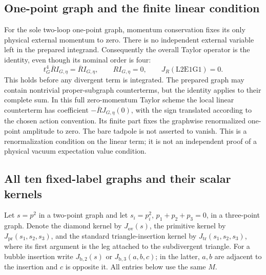 \subsection{One-point graph and the finite linear condition}

For the sole two-loop one-point graph, momentum conservation fixes its only
physical external momentum to zero. There is no independent external
variable left in the prepared integrand. Consequently the overall Taylor
operator is the identity, even though its nominal order is four:
\[
 t_G^4\overline R I_{G,\eta}=\overline R I_{G,\eta},\qquad
 RI_{G,\eta}=0,
 \qquad J_R(\mathrm{L2E1G1})=0.
\]
This holds before any divergent term is integrated. The prepared graph may
contain nontrivial proper-subgraph counterterms, but the identity applies
to their complete sum. In this full zero-momentum Taylor scheme the local
linear counterterm has coefficient
$-\overline R J_{G,\eta}(0)$, with the sign translated according to the
chosen action convention. Its finite part fixes the graphwise renormalized
one-point amplitude to zero. The bare tadpole is not asserted to vanish.
This is a renormalization condition on the linear term; it is not an
independent proof of a physical vacuum expectation value condition.

\subsection{All ten fixed-label graphs and their scalar kernels}

Let $s=p^2$ in a two-point graph and let
$s_i=p_i^2$, $p_1+p_2+p_3=0$, in a three-point graph. Denote the diamond
kernel by $J_{\mathrm{ov}}(s)$, the primitive kernel by
$J_{\mathrm{pr}}(s_1,s_2,s_3)$, and the standard triangle-insertion kernel
by $J_{\mathrm{tr}}(s_1,s_2,s_3)$, where its first argument is the leg
attached to the subdivergent triangle. For a bubble insertion write
$J_{\mathrm{b},2}(s)$ or $J_{\mathrm{b},3}(a,b,c)$; in the latter,
$a,b$ are adjacent to the insertion and $c$ is opposite it.
All entries below use the same $M$.

